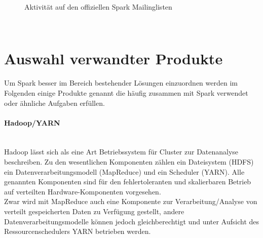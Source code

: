 \begin{figure}[ht!]
	\centering
	\caption{Aktivität auf den offiziellen Spark Mailinglisten}
	\label{fig:mailinglisten}
\end{figure}
\\

\section{Auswahl verwandter Produkte}
Um Spark besser im Bereich bestehender Lösungen einzuordnen werden im Folgenden einige Produkte genannt die häufig zusammen mit Spark verwendet oder ähnliche Aufgaben erfüllen.
\paragraph{Hadoop/YARN}\\
Hadoop lässt sich als eine Art Betriebssystem für Cluster zur Datenanalyse beschreiben. Zu den wesentlichen Komponenten zählen ein Dateisystem (HDFS) ein Datenverarbeitungsmodell (MapReduce) und ein Scheduler (YARN).
Alle genannten Komponenten sind für den fehlertoleranten und skalierbaren Betrieb auf verteilten Hardware-Komponenten vorgesehen.\\
Zwar wird mit MapReduce auch eine Komponente zur Verarbeitung/Analyse von verteilt gespeicherten Daten zu Verfügung gestellt, andere Datenverarbeitungsmodelle können jedoch gleichberechtigt und unter Aufsicht des Ressourcenschedulers YARN betrieben werden.\\

